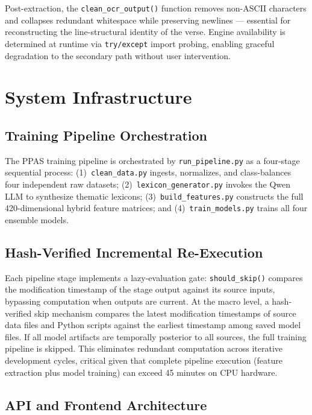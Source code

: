 \documentclass[conference]{IEEEtran}
\begin{document}
Post-extraction, the \texttt{clean\_ocr\_output()}
function removes non-ASCII characters and collapses redundant whitespace
while preserving newlines --- essential for reconstructing the
line-structural identity of the verse. Engine availability is determined
at runtime via \texttt{try/except} import probing, enabling graceful
degradation to the secondary path without user intervention.

\section{System Infrastructure}
\label{sec:infra}

\subsection{Training Pipeline Orchestration}

The PPAS training pipeline is orchestrated by \texttt{run\_pipeline.py}
as a four-stage sequential process: (1)~\texttt{clean\_data.py} ingests,
normalizes, and class-balances four independent raw datasets;
(2)~\texttt{lexicon\_generator.py} invokes the Qwen LLM to synthesize
thematic lexicons; (3)~\texttt{build\_features.py} constructs the full
420-dimensional hybrid feature matrices; and
(4)~\texttt{train\_models.py} trains all four ensemble models.

\subsection{Hash-Verified Incremental Re-Execution}

Each pipeline stage implements a lazy-evaluation gate: \texttt{should\_skip()}
compares the modification timestamp of the stage output against its
source inputs, bypassing computation when outputs are current. At the
macro level, a hash-verified skip mechanism compares the latest
modification timestamps of source data files and Python scripts against
the earliest timestamp among saved model files. If all model artifacts
are temporally posterior to all sources, the full training pipeline is
skipped. This eliminates redundant computation across iterative
development cycles, critical given that complete pipeline execution
(feature extraction plus model training) can exceed 45 minutes on CPU
hardware.

\subsection{API and Frontend Architecture}
\end{document}
